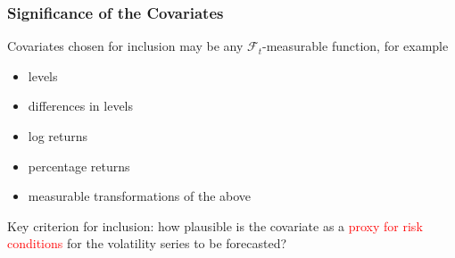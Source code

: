\documentclass[9pt]{beamer}
\newcommand{\V}{\textbf{V}}
\theoremstyle{definition}
\begin{document}
    
    \begin{frame}
        \frametitle{Significance of the Covariates}
        Covariates chosen for inclusion may be any $\mathcal{F}_{t}$-measurable function, for example
        \begin{itemize}
            \item levels
            \item differences in levels
            \item log returns
            \item percentage returns
            \item measurable transformations of the above
        \end{itemize}
    
        \bigbreak 
    
        Key criterion for inclusion: how plausible is the covariate as a \textcolor{red}{proxy for risk conditions} for the volatility series to be forecasted?
    \end{frame}
    
\end{document}
